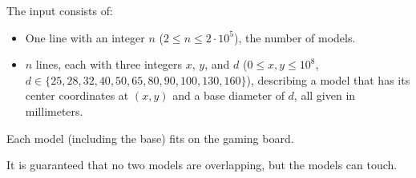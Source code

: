 
The input consists of:
\begin{itemize}
\item One line with an integer $n$ ($2\leq n \leq 2\cdot 10^5$), the number of models.
\item $n$ lines, each with three integers $x$, $y$, and $d$
($0 \leq x, y \leq 10^8$, \\
$d\in\{25, 28, 32, 40, 50, 65, 80, 90, 100, 130, 160\}$),
describing a model that has its center coordinates at $(x,y)$ and a base diameter of $d$, all given in millimeters.
\end{itemize}
Each model (including the base) fits on the gaming board.

It is guaranteed that no two models are overlapping, but the models can touch.
